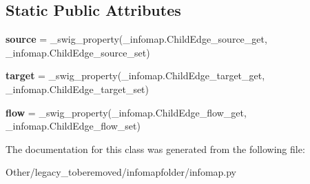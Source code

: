 \subsection*{Static Public Attributes}
\begin{DoxyCompactItemize}
\item 
\mbox{\label{classinfomapfolder_1_1infomap_1_1ChildEdge_a667375b9b1fa31db68ddf1c7c4275c39}} 
{\bfseries source} = \+\_\+swig\+\_\+property(\+\_\+infomap.\+Child\+Edge\+\_\+source\+\_\+get, \+\_\+infomap.\+Child\+Edge\+\_\+source\+\_\+set)
\item 
\mbox{\label{classinfomapfolder_1_1infomap_1_1ChildEdge_a41ee1b0d441c81268d5792dbfb35f60b}} 
{\bfseries target} = \+\_\+swig\+\_\+property(\+\_\+infomap.\+Child\+Edge\+\_\+target\+\_\+get, \+\_\+infomap.\+Child\+Edge\+\_\+target\+\_\+set)
\item 
\mbox{\label{classinfomapfolder_1_1infomap_1_1ChildEdge_a8d8f52fc9443b7d469f9e204fc93d4c6}} 
{\bfseries flow} = \+\_\+swig\+\_\+property(\+\_\+infomap.\+Child\+Edge\+\_\+flow\+\_\+get, \+\_\+infomap.\+Child\+Edge\+\_\+flow\+\_\+set)
\end{DoxyCompactItemize}


The documentation for this class was generated from the following file\+:\begin{DoxyCompactItemize}
\item 
Other/legacy\+\_\+toberemoved/infomapfolder/infomap.\+py\end{DoxyCompactItemize}
